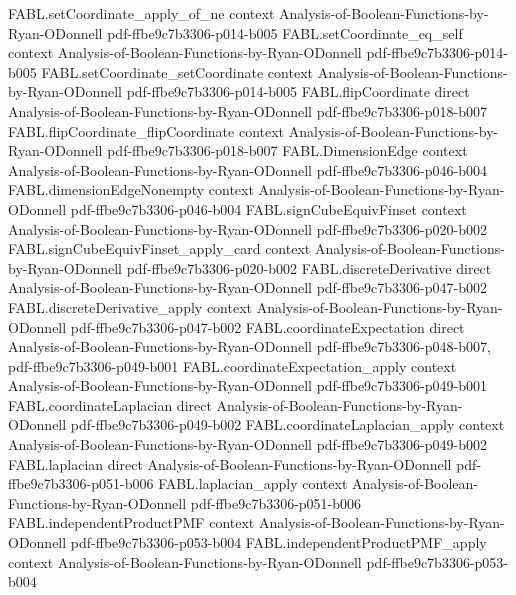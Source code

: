 \begin{theorem}
\proofstep
  {FABL.setCoordinate_apply_of_ne}
  {context}
  {Analysis-of-Boolean-Functions-by-Ryan-ODonnell}
  {pdf-ffbe9c7b3306-p014-b005}
\proofstep
  {FABL.setCoordinate_eq_self}
  {context}
  {Analysis-of-Boolean-Functions-by-Ryan-ODonnell}
  {pdf-ffbe9c7b3306-p014-b005}
\proofstep
  {FABL.setCoordinate_setCoordinate}
  {context}
  {Analysis-of-Boolean-Functions-by-Ryan-ODonnell}
  {pdf-ffbe9c7b3306-p014-b005}
\proofstep
  {FABL.flipCoordinate}
  {direct}
  {Analysis-of-Boolean-Functions-by-Ryan-ODonnell}
  {pdf-ffbe9c7b3306-p018-b007}
\proofstep
  {FABL.flipCoordinate_flipCoordinate}
  {context}
  {Analysis-of-Boolean-Functions-by-Ryan-ODonnell}
  {pdf-ffbe9c7b3306-p018-b007}
\proofstep
  {FABL.DimensionEdge}
  {context}
  {Analysis-of-Boolean-Functions-by-Ryan-ODonnell}
  {pdf-ffbe9c7b3306-p046-b004}
\proofstep
  {FABL.dimensionEdgeNonempty}
  {context}
  {Analysis-of-Boolean-Functions-by-Ryan-ODonnell}
  {pdf-ffbe9c7b3306-p046-b004}
\proofstep
  {FABL.signCubeEquivFinset}
  {context}
  {Analysis-of-Boolean-Functions-by-Ryan-ODonnell}
  {pdf-ffbe9c7b3306-p020-b002}
\proofstep
  {FABL.signCubeEquivFinset_apply_card}
  {context}
  {Analysis-of-Boolean-Functions-by-Ryan-ODonnell}
  {pdf-ffbe9c7b3306-p020-b002}
\proofstep
  {FABL.discreteDerivative}
  {direct}
  {Analysis-of-Boolean-Functions-by-Ryan-ODonnell}
  {pdf-ffbe9c7b3306-p047-b002}
\proofstep
  {FABL.discreteDerivative_apply}
  {context}
  {Analysis-of-Boolean-Functions-by-Ryan-ODonnell}
  {pdf-ffbe9c7b3306-p047-b002}
\proofstep
  {FABL.coordinateExpectation}
  {direct}
  {Analysis-of-Boolean-Functions-by-Ryan-ODonnell}
  {pdf-ffbe9c7b3306-p048-b007,
    pdf-ffbe9c7b3306-p049-b001}
\proofstep
  {FABL.coordinateExpectation_apply}
  {context}
  {Analysis-of-Boolean-Functions-by-Ryan-ODonnell}
  {pdf-ffbe9c7b3306-p049-b001}
\proofstep
  {FABL.coordinateLaplacian}
  {direct}
  {Analysis-of-Boolean-Functions-by-Ryan-ODonnell}
  {pdf-ffbe9c7b3306-p049-b002}
\proofstep
  {FABL.coordinateLaplacian_apply}
  {context}
  {Analysis-of-Boolean-Functions-by-Ryan-ODonnell}
  {pdf-ffbe9c7b3306-p049-b002}
\proofstep
  {FABL.laplacian}
  {direct}
  {Analysis-of-Boolean-Functions-by-Ryan-ODonnell}
  {pdf-ffbe9c7b3306-p051-b006}
\proofstep
  {FABL.laplacian_apply}
  {context}
  {Analysis-of-Boolean-Functions-by-Ryan-ODonnell}
  {pdf-ffbe9c7b3306-p051-b006}
\proofstep
  {FABL.independentProductPMF}
  {context}
  {Analysis-of-Boolean-Functions-by-Ryan-ODonnell}
  {pdf-ffbe9c7b3306-p053-b004}
\proofstep
  {FABL.independentProductPMF_apply}
  {context}
  {Analysis-of-Boolean-Functions-by-Ryan-ODonnell}
  {pdf-ffbe9c7b3306-p053-b004}

\end{theorem}
